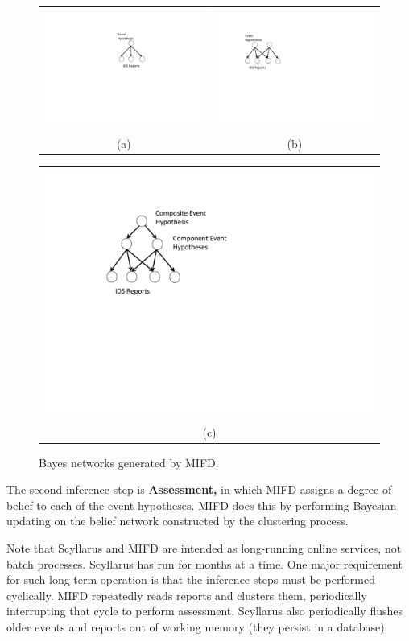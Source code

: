 \begin{figure}
  \centering
  \begin{tabular}{c@{\hspace{1cm}}c}
  \includegraphics[width=.2\columnwidth]{figures/bnets1-cropped.pdf} &
  \includegraphics[width=.267\columnwidth]{figures/bnets2-cropped.pdf} 
  \\ (a) & (b) \\
  \end{tabular}
  \newline{}
  \begin{tabular}{c}
  \includegraphics[width=.4\columnwidth]{figures/bnets3-cropped.pdf} 
    \\ (c)
  \end{tabular}
  \caption{Bayes networks generated by MIFD.}
  \label{fig:bnets}
  
\end{figure}

The second inference step is \textbf{Assessment,} in which MIFD assigns a degree of belief
to each of the event hypotheses.
MIFD does this by performing Bayesian updating on the belief network constructed
by the clustering process. 

Note that Scyllarus and MIFD are intended as long-running online services, not batch processes.
Scyllarus has run for months at a time.
One major requirement for such long-term operation is that the
inference steps must be performed cyclically.  MIFD repeatedly reads
reports and clusters them, periodically interrupting that
cycle to perform assessment.
Scyllarus also periodically flushes older events and reports out of working
memory (they persist in a database).

